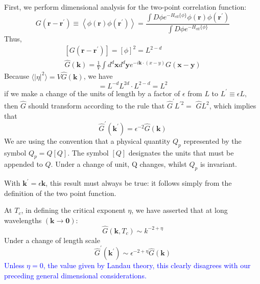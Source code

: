 \documentclass[12pt,titlepage]{article}
\newcommand{\bluep}[1]{\textcolor{blue}{#1}}
\numberwithin{equation}{section}
\begin{document}
First, we perform dimensional analysis for the two-point correlation function:
\begin{equation}
G\left(\mathbf{r}-\mathbf{r}^{\prime}\right) \equiv\left\langle\phi(\mathbf{r}) \phi\left(\mathbf{r}^{\prime}\right)\right\rangle=\frac{\int D \phi e^{-H_{\mathrm{eff}}\{\phi\}} \phi(\mathbf{r}) \phi\left(\mathbf{r}^{\prime}\right)}{\int D \phi e^{-H_{\mathrm{eff}}\{\phi\}}}
\end{equation}
Thus, 
\begin{equation}
\begin{array}{c}{\left[G\left(\mathbf{r}-\mathbf{r}^{\prime}\right)\right]=[\phi]^{2}=L^{2-d}} \\ {\hat{G}(\mathbf{k})=\frac{1}{V} \int d^{d} \mathbf{x} d^{d} \mathbf{y} e^{-i \mathbf{k} \cdot(x-y)} G(\mathbf{x}-\mathbf{y})}\end{array}
\end{equation}
Because $\langle|\eta|^2\rangle=V\hat G(\textbf{k})$, we have
\begin{equation}
[\hat{G}(\mathbf{k})]=L^{-d} L^{2 d} \cdot L^{2-d}=L^{2}
\end{equation}
if we make a change of the units of length by a factor of $\epsilon$ from $L$ to $L^{\prime} \equiv \epsilon L,$ then $\hat{G}$ should transform according to the rule that $\hat{G}^{\prime} L^{\prime 2}=$ $\hat{G} L^{2}$, which implies that 
\begin{equation}
\label{DA_eta}
\hat{G}^{\prime}\left(\mathbf{k}^{\prime}\right)=\epsilon^{-2} \hat{G}(\mathbf{k})
\end{equation}
We are using the convention that a physical quantity $Q_p$ represented by the symbol $Q_p=Q[Q]$. The symbol $[Q]$ designates the units that must be appended to $Q$. Under a change of unit, Q changes, whilst $Q_p$ is invariant.

With $\mathbf{k}^{\prime}=\epsilon \mathbf{k}$, this result must always be true: it follows simply from the definition of the two point function.

At $T_c$, in defining the critical exponent $\eta$, we have asserted that at long wavelengths $(\boldsymbol{k} \rightarrow \mathbf{0})$:
\begin{equation}
\label{critical_eta}
\hat{G}\left(\mathbf{k}, T_{c}\right) \sim k^{-2+\eta}
\end{equation}
Under a change of length scale
\begin{equation}
\hat{G}^{\prime}\left(\mathbf{k}^{\prime}\right) \sim \epsilon^{-2+\eta} \hat{G}(\mathbf{k})
\end{equation}
\bluep{Unless $\eta=0$, the value given by Landau theory, this clearly disagrees with our preceding general dimensional considerations.}
\end{document}
